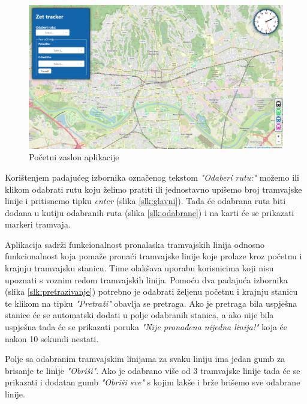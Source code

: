 \documentclass[zavrsnirad]{fer}
\begin{document}
\begin{figure}[H]
	\centering
	\includegraphics[width=\linewidth]{Figures/default.png} 
	\caption{Početni zaslon aplikacije}
	\label{slk:default}
\end{figure}
\newpage
Korištenjem padajućeg izbornika označenog tekstom \textit{"Odaberi rutu:"} možemo ili klikom odabrati rutu koju želimo pratiti ili jednostavno upišemo broj tramvajske linije i pritisnemo tipku \textit{enter} (slika \ref{slk:glavni}). Tada će odabrana ruta biti dodana u kutiju odabranih ruta (slika \ref{slk:odabrane}) i na karti će se prikazati markeri tramvaja.

Aplikacija sadrži funkcionalnost pronalaska tramvajskih linija odnosno funkcionalnost koja pomaže pronaći tramvajske linije koje prolaze kroz početnu i krajnju tramvajsku stanicu. Time olakšava uporabu korisnicima koji nisu upoznati s voznim redom tramvajskih linija. Pomoću dva padajuća izbornika (slika \ref{slk:pretrazivanje}) potrebno je odabrati željenu početnu i krajnju stanicu te klikom na tipku \textit{"Pretraži"} obavlja se pretraga. Ako je pretraga bila uspješna stanice će se automatski dodati u polje odabranih stanica, a ako nije bila uspješna tada će se prikazati poruka \textit{"Nije pronađena nijedna linija!"} koja će nakon 10 sekundi nestati.

Polje sa odabranim tramvajskim linijama za svaku liniju ima jedan gumb za brisanje te linije \textit{"Obriši"}. Ako je odabrano više od 3 tramvajske linije tada će se prikazati i dodatan gumb \textit{"Obriši sve"} s kojim lakše i brže brišemo sve odabrane linije.\\
\end{document}
